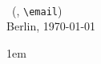 
\begin{small}
\parindent 0pt
\meta \\ \autor\ (\matrikelnummer, \nolinkurl{\email}) \\ Berlin, \today
\end{small}
\vskip 1.0cm
\begin{center}\begin{Large}\titel\end{Large}\end{center}
\vskip 0.5cm

\parindent 1em
\onehalfspacing
